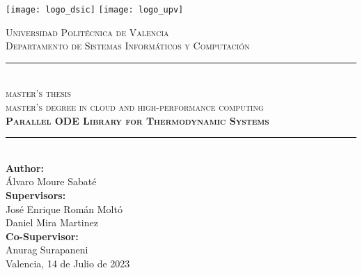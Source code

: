 \begin{titlepage}

\begin{paracol}{2}
	\centering
	\vspace*{-23pt}
	\texttt{[image: logo\_dsic]}
	\switchcolumn
	\centering
	\texttt{[image: logo\_upv]}
\end{paracol}

\center

\vspace{1cm}

\textsc{\LARGE Universidad Politécnica de Valencia}\\[0.8cm]

\textsc{\Large Departamento de Sistemas Informáticos y Computación}\\[0.8cm]

\rule{\linewidth}{0.8mm}\\[1cm]

\textsc{\LARGE master's thesis}\\[0.5cm]

\textsc{\LARGE master's degree in cloud and high-performance computing}\\[0.8cm]

{\bfseries \scshape{\huge Parallel ODE Library for Thermodynamic Systems}}\\[1cm]

\rule{\linewidth}{0.8mm}\\[1.5cm]


\textbf{\large Author:}\\[0.2cm]

{\large Álvaro Moure Sabaté}\\[0.5cm]

\textbf{\large Supervisors:}\\[0.2cm]
{\large José Enrique Román Moltó}\\
{\large Daniel Mira Martinez}\\[0.5cm]

\textbf{\large Co-Supervisor:}\\[0.2cm]
{\large Anurag Surapaneni}\\[2cm]

{\large Valencia, 14 de Julio de 2023}

\end{titlepage}